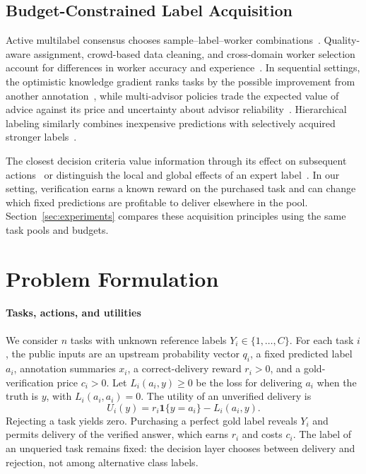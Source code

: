 \documentclass[journal]{IEEEtran}
\newcommand{\ind}{\mathbf{1}}
\begin{document}
\subsection{Budget-Constrained Label Acquisition}
Active multilabel consensus chooses sample--label--worker combinations~\cite{yu2021active}. Quality-aware assignment, crowd-based data cleaning, and cross-domain worker selection account for differences in worker accuracy and experience~\cite{gao2021quality,zhang2022cleaning,sun2024cross}. In sequential settings, the optimistic knowledge gradient ranks tasks by the possible improvement from another annotation~\cite{chen2013optimistic}, while multi-advisor policies trade the expected value of advice against its price and uncertainty about advisor reliability~\cite{guo2023maddm,guo2025cautious}. Hierarchical labeling similarly combines inexpensive predictions with selectively acquired stronger labels~\cite{zhang2025lmcrowd}.

The closest decision criteria value information through its effect on subsequent actions~\cite{kapoor2007selective} or distinguish the local and global effects of an expert label~\cite{liu2015boosting}. In our setting, verification earns a known reward on the purchased task and can change which fixed predictions are profitable to deliver elsewhere in the pool. Section~\ref{sec:experiments} compares these acquisition principles using the same task pools and budgets.


\section{Problem Formulation}
\label{sec:problem}
\paragraph{Tasks, actions, and utilities}
We consider $n$ tasks with unknown reference labels $Y_i\in\{1,\ldots,C\}$. For each task $i$, the public inputs are an upstream probability vector $q_i$, a fixed predicted label $a_i$, annotation summaries $x_i$, a correct-delivery reward $r_i>0$, and a gold-verification price $c_i>0$. Let $L_i(a_i,y)\ge0$ be the loss for delivering $a_i$ when the truth is $y$, with $L_i(a_i,a_i)=0$. The utility of an unverified delivery is
\begin{equation}
 U_i(y)=r_i\ind\{y=a_i\}-L_i(a_i,y).
 \label{eq:utility}
\end{equation}
Rejecting a task yields zero. Purchasing a perfect gold label reveals $Y_i$ and permits delivery of the verified answer, which earns $r_i$ and costs $c_i$. The label of an unqueried task remains fixed: the decision layer chooses between delivery and rejection, not among alternative class labels.
\end{document}
